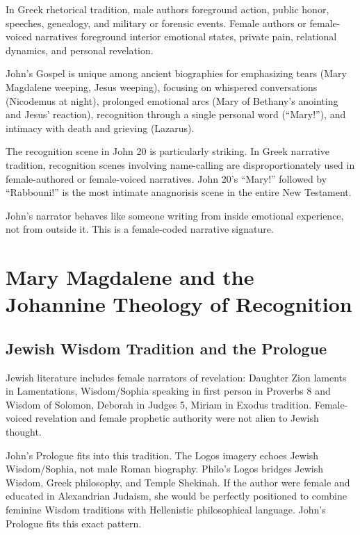 In Greek rhetorical tradition, male authors foreground action, public honor, speeches, genealogy, and military or forensic events.
Female authors or female-voiced narratives foreground interior emotional states, private pain, relational dynamics, and personal revelation.

John's Gospel is unique among ancient biographies for emphasizing tears (Mary Magdalene weeping, Jesus weeping), focusing on whispered conversations (Nicodemus at night), prolonged emotional arcs (Mary of Bethany's anointing and Jesus' reaction), recognition through a single personal word (``Mary!''), and intimacy with death and grieving (Lazarus).

The recognition scene in John 20 is particularly striking.
In Greek narrative tradition, recognition scenes involving name-calling are disproportionately used in female-authored or female-voiced narratives.
John 20's ``Mary!'' followed by ``Rabbouni!'' is the most intimate anagnorisis scene in the entire New Testament.

John's narrator behaves like someone writing from inside emotional experience, not from outside it.
This is a female-coded narrative signature.

\section{Mary Magdalene and the Johannine Theology of Recognition}\label{sec:johannine-theology-recognition}

\subsection{Jewish Wisdom Tradition and the Prologue}\label{subsec:jewish-wisdom-tradition}

Jewish literature includes female narrators of revelation: Daughter Zion laments in Lamentations, Wisdom/Sophia speaking in first person in Proverbs 8 and Wisdom of Solomon, Deborah in Judges 5, Miriam in Exodus tradition.
Female-voiced revelation and female prophetic authority were not alien to Jewish thought.

John's Prologue fits into this tradition.
The Logos imagery echoes Jewish Wisdom/Sophia, not male Roman biography.
Philo's Logos bridges Jewish Wisdom, Greek philosophy, and Temple Shekinah.
If the author were female and educated in Alexandrian Judaism, she would be perfectly positioned to combine feminine Wisdom traditions with Hellenistic philosophical language.
John's Prologue fits this exact pattern.

